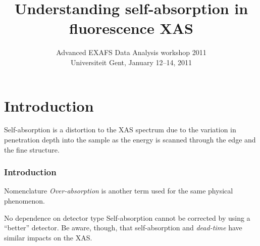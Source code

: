 \documentclass[10pt, xcolor=x11names, compress]{beamer}
\title{Understanding self-absorption in fluorescence XAS}
\date[NSLS2010]{Advanced EXAFS Data Analysis workshop 2011\\
  Universiteit Gent, January 12--14, 2011}
\begin{document}
\maketitle


\section[Introduction]{Introduction}
\begin{frame}
  
  Self-absorption is a distortion to the XAS spectrum due to the
  variation in penetration depth into the sample as the energy is
  scanned through the edge and the fine structure.

  \frametitle{Introduction}
  \begin{block}{Nomenclature}
    \textit{Over-absorption} is another term used for the same physical
    phenomenon.
  \end{block}

  \begin{block}{No dependence on detector type}
    Self-absorption cannot be corrected by using a ``better''
    detector.  Be aware, though, that self-absorption and
    \textit{dead-time} have similar impacts on the XAS.
  \end{block}
\end{frame}
\end{document}
